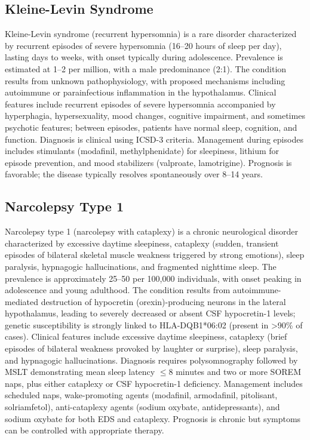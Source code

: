 \subsection{Kleine-Levin Syndrome}
\label{sec:Kleine-Levin Syndrome}
Kleine-Levin syndrome (recurrent hypersomnia) is a rare disorder characterized by recurrent episodes of severe hypersomnia (16--20 hours of sleep per day), lasting days to weeks, with onset typically during adolescence. Prevalence is estimated at 1--2 per million, with a male predominance (2:1). The condition results from unknown pathophysiology, with proposed mechanisms including autoimmune or parainfectious inflammation in the hypothalamus. Clinical features include recurrent episodes of severe hypersomnia accompanied by hyperphagia, hypersexuality, mood changes, cognitive impairment, and sometimes psychotic features; between episodes, patients have normal sleep, cognition, and function. Diagnosis is clinical using ICSD-3 criteria. Management during episodes includes stimulants (modafinil, methylphenidate) for sleepiness, lithium for episode prevention, and mood stabilizers (valproate, lamotrigine). Prognosis is favorable; the disease typically resolves spontaneously over 8--14 years.

\subsection{Narcolepsy Type 1}
\label{sec:Narcolepsy Type 1}
Narcolepsy type 1 (narcolepsy with cataplexy) is a chronic neurological disorder characterized by excessive daytime sleepiness, cataplexy (sudden, transient episodes of bilateral skeletal muscle weakness triggered by strong emotions), sleep paralysis, hypnagogic hallucinations, and fragmented nighttime sleep. The prevalence is approximately 25--50 per 100,000 individuals, with onset peaking in adolescence and young adulthood. The condition results from autoimmune-mediated destruction of hypocretin (orexin)-producing neurons in the lateral hypothalamus, leading to severely decreased or absent CSF hypocretin-1 levels; genetic susceptibility is strongly linked to HLA-DQB1*06:02 (present in >90\% of cases). Clinical features include excessive daytime sleepiness, cataplexy (brief episodes of bilateral weakness provoked by laughter or surprise), sleep paralysis, and hypnagogic hallucinations. Diagnosis requires polysomnography followed by MSLT demonstrating mean sleep latency $\le$8 minutes and two or more SOREM naps, plus either cataplexy or CSF hypocretin-1 deficiency. Management includes scheduled naps, wake-promoting agents (modafinil, armodafinil, pitolisant, solriamfetol), anti-cataplexy agents (sodium oxybate, antidepressants), and sodium oxybate for both EDS and cataplexy. Prognosis is chronic but symptoms can be controlled with appropriate therapy.

